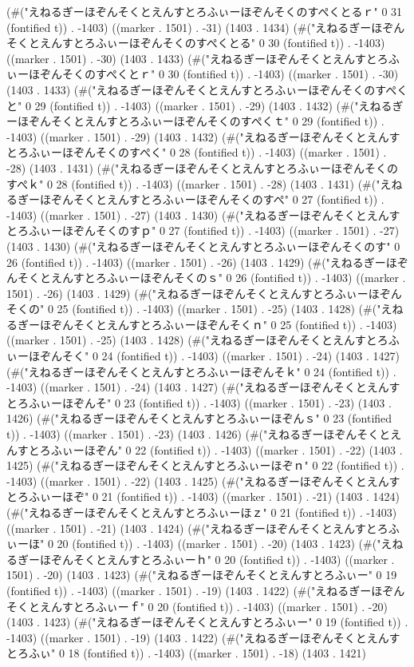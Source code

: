 (#("えねるぎーほぞんそくとえんすとろふぃーほぞんそくのすぺくとるｒ" 0 31 (fontified t)) . -1403) ((marker . 1501) . -31) (1403 . 1434) (#("えねるぎーほぞんそくとえんすとろふぃーほぞんそくのすぺくとる" 0 30 (fontified t)) . -1403) ((marker . 1501) . -30) (1403 . 1433) (#("えねるぎーほぞんそくとえんすとろふぃーほぞんそくのすぺくとｒ" 0 30 (fontified t)) . -1403) ((marker . 1501) . -30) (1403 . 1433) (#("えねるぎーほぞんそくとえんすとろふぃーほぞんそくのすぺくと" 0 29 (fontified t)) . -1403) ((marker . 1501) . -29) (1403 . 1432) (#("えねるぎーほぞんそくとえんすとろふぃーほぞんそくのすぺくｔ" 0 29 (fontified t)) . -1403) ((marker . 1501) . -29) (1403 . 1432) (#("えねるぎーほぞんそくとえんすとろふぃーほぞんそくのすぺく" 0 28 (fontified t)) . -1403) ((marker . 1501) . -28) (1403 . 1431) (#("えねるぎーほぞんそくとえんすとろふぃーほぞんそくのすぺｋ" 0 28 (fontified t)) . -1403) ((marker . 1501) . -28) (1403 . 1431) (#("えねるぎーほぞんそくとえんすとろふぃーほぞんそくのすぺ" 0 27 (fontified t)) . -1403) ((marker . 1501) . -27) (1403 . 1430) (#("えねるぎーほぞんそくとえんすとろふぃーほぞんそくのすｐ" 0 27 (fontified t)) . -1403) ((marker . 1501) . -27) (1403 . 1430) (#("えねるぎーほぞんそくとえんすとろふぃーほぞんそくのす" 0 26 (fontified t)) . -1403) ((marker . 1501) . -26) (1403 . 1429) (#("えねるぎーほぞんそくとえんすとろふぃーほぞんそくのｓ" 0 26 (fontified t)) . -1403) ((marker . 1501) . -26) (1403 . 1429) (#("えねるぎーほぞんそくとえんすとろふぃーほぞんそくの" 0 25 (fontified t)) . -1403) ((marker . 1501) . -25) (1403 . 1428) (#("えねるぎーほぞんそくとえんすとろふぃーほぞんそくｎ" 0 25 (fontified t)) . -1403) ((marker . 1501) . -25) (1403 . 1428) (#("えねるぎーほぞんそくとえんすとろふぃーほぞんそく" 0 24 (fontified t)) . -1403) ((marker . 1501) . -24) (1403 . 1427) (#("えねるぎーほぞんそくとえんすとろふぃーほぞんそｋ" 0 24 (fontified t)) . -1403) ((marker . 1501) . -24) (1403 . 1427) (#("えねるぎーほぞんそくとえんすとろふぃーほぞんそ" 0 23 (fontified t)) . -1403) ((marker . 1501) . -23) (1403 . 1426) (#("えねるぎーほぞんそくとえんすとろふぃーほぞんｓ" 0 23 (fontified t)) . -1403) ((marker . 1501) . -23) (1403 . 1426) (#("えねるぎーほぞんそくとえんすとろふぃーほぞん" 0 22 (fontified t)) . -1403) ((marker . 1501) . -22) (1403 . 1425) (#("えねるぎーほぞんそくとえんすとろふぃーほぞｎ" 0 22 (fontified t)) . -1403) ((marker . 1501) . -22) (1403 . 1425) (#("えねるぎーほぞんそくとえんすとろふぃーほぞ" 0 21 (fontified t)) . -1403) ((marker . 1501) . -21) (1403 . 1424) (#("えねるぎーほぞんそくとえんすとろふぃーほｚ" 0 21 (fontified t)) . -1403) ((marker . 1501) . -21) (1403 . 1424) (#("えねるぎーほぞんそくとえんすとろふぃーほ" 0 20 (fontified t)) . -1403) ((marker . 1501) . -20) (1403 . 1423) (#("えねるぎーほぞんそくとえんすとろふぃーｈ" 0 20 (fontified t)) . -1403) ((marker . 1501) . -20) (1403 . 1423) (#("えねるぎーほぞんそくとえんすとろふぃー" 0 19 (fontified t)) . -1403) ((marker . 1501) . -19) (1403 . 1422) (#("えねるぎーほぞんそくとえんすとろふぃーｆ" 0 20 (fontified t)) . -1403) ((marker . 1501) . -20) (1403 . 1423) (#("えねるぎーほぞんそくとえんすとろふぃー" 0 19 (fontified t)) . -1403) ((marker . 1501) . -19) (1403 . 1422) (#("えねるぎーほぞんそくとえんすとろふぃ" 0 18 (fontified t)) . -1403) ((marker . 1501) . -18) (1403 . 1421) 